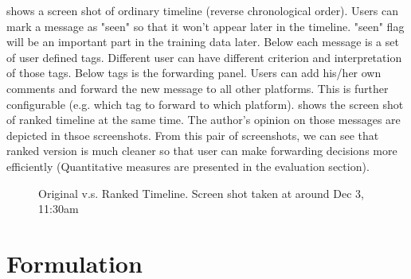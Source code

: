 \documentclass{sig-alternate}
\begin{document}
\rfig{\ref{fig:srfe_hometimeline}} shows a screen shot of 
ordinary timeline (reverse chronological order). 
Users can mark a message as "seen" so that it won't appear later in the timeline. 
"seen" flag will be an important part in the training data later. 
Below each message is a set of user defined tags. 
Different user can have different criterion and interpretation of those tags. 
Below tags is the forwarding panel. 
Users can add his/her own comments and forward the new message to all other platforms. 
This is further configurable (e.g. which tag to forward to which platform). 
\rfig{\ref{fig:srfe_rankedtimeline}} shows the screen shot 
of ranked timeline at the same time. 
The author's opinion on those messages are depicted in thsoe screenshots. 
From this pair of screenshots, we can see that ranked version is much cleaner
so that user can make forwarding decisions more efficiently 
(Quantitative measures are presented in the evaluation section). 

\begin{figure}[t!]
	\centering
	\caption{Original v.s. Ranked Timeline. Screen shot taken at around Dec 3, 11:30am}
\end{figure}

%
%
%


\section{Formulation}
\label{sec:Formulation}
\end{document}
